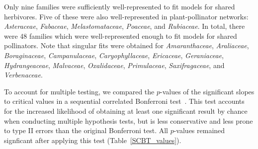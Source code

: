 \documentclass[12pt]{article}
\begin{document}
\begin{spacing}{1.5}
    Only nine families were sufficiently well-represented to fit models for shared herbivores. Five of these were also well-represented in plant-pollinator networks: \emph{Asteraceae}, \emph{Fabaceae}, \emph{Melastomataceae}, \emph{Poaceae}, and \emph{Rubiaceae}. In total, there were 48 families which were well-represented enough to fit models for shared pollinators. Note that singular fits were obtained for \emph{Amaranthaceae}, \emph{Araliaceae}, \emph{Boraginaceae},
    \emph{Campanulaceae}, \emph{Caryophyllaceae}, \emph{Ericaceae}, \emph{Geraniaceae}, 
    \emph{Hydrangeaceae}, \emph{Malvaceae}, \emph{Oxalidaceae}, \emph{Primulaceae}, 
    \emph{Saxifragaceae}, and \emph{Verbenaceae}. 
  

    To account for multiple testing, we compared the $p$-values of the significant slopes to critical values in a sequential correlated Bonferroni test~\citep{Drezner2016}. This test accounts for the increased likelihood of obtaining at least one significant result by chance when conducting multiple hypothesis tests, but is less conservative and less prone to type II errors than the original Bonferroni test. All $p$-values remained signficant after applying this test (Table~\ref{SCBT_values}).


\end{spacing}
\end{document}
